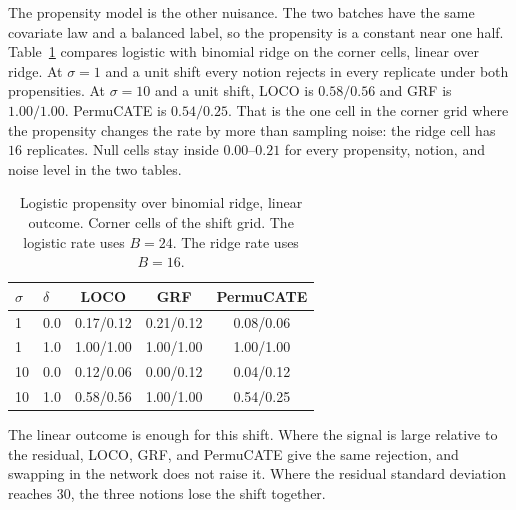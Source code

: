 The propensity model is the other nuisance.
The two batches have the same covariate law and a balanced label, so the
propensity is a constant near one half.
Table~\ref{tab:lm-ridge} compares logistic with binomial ridge on the
corner cells, linear over ridge.
At \(\sigma=1\) and a unit shift every notion rejects in every replicate
under both propensities.
At \(\sigma=10\) and a unit shift, LOCO is \(0.58/0.56\) and GRF is
\(1.00/1.00\).
PermuCATE is \(0.54/0.25\).
That is the one cell in the corner grid where the propensity changes the
rate by more than sampling noise: the ridge cell has \(16\) replicates.
Null cells stay inside \(0.00\)--\(0.21\) for every propensity, notion, and
noise level in the two tables.

\begin{table}[t]
\centering
\small
\caption{Logistic propensity over binomial ridge, linear outcome.
Corner cells of the shift grid.
The logistic rate uses \(B=24\).
The ridge rate uses \(B=16\).}
\label{tab:lm-ridge}
\begin{tabular}{llccc}
\toprule
\(\sigma\) & \(\delta\) & LOCO & GRF & PermuCATE \\
\midrule
1 & 0.0 & 0.17/0.12 & 0.21/0.12 & 0.08/0.06 \\
1 & 1.0 & 1.00/1.00 & 1.00/1.00 & 1.00/1.00 \\
10 & 0.0 & 0.12/0.06 & 0.00/0.12 & 0.04/0.12 \\
10 & 1.0 & 0.58/0.56 & 1.00/1.00 & 0.54/0.25 \\
\bottomrule
\end{tabular}
\end{table}

The linear outcome is enough for this shift.
Where the signal is large relative to the residual, LOCO, GRF, and
PermuCATE give the same rejection, and swapping in the network does not
raise it.
Where the residual standard deviation reaches \(30\), the three notions
lose the shift together.
